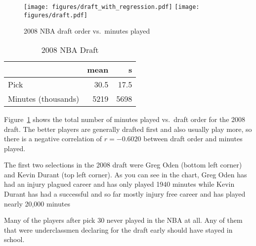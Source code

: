 \documentclass[letterpaper]{exam}
\begin{document}
\begin{questions}
      \question{}\label{q:draft}

        \begin{figure}[H]
          \centering
          \ifprintanswers{}
            \texttt{[image: figures/draft\_with\_regression.pdf]}
          \else
            \texttt{[image: figures/draft.pdf]}
          \fi
          \caption{2008 NBA draft order vs.\ minutes played}\label{fig:draft}
        \end{figure}

        \begin{table}[H]
          \centering
          \begin{tabular}{lrr}
            \toprule
                                & mean & s \\
            \midrule
            Pick                & 30.5 & 17.5 \\
            Minutes (thousands) & 5219 & 5698 \\
            \bottomrule
          \end{tabular}
          \caption{2008 NBA Draft}
        \end{table}

        Figure~\ref{fig:draft} shows the total number of minutes played vs.\ draft
        order for the 2008 draft.  The better players are generally drafted first
        and also usually play more, so there is a negative correlation of 
        $r = -0.6020$ between draft order and minutes played.

        The first two selections in the 2008 draft were Greg Oden (bottom left
        corner) and Kevin Durant (top left corner).  As you can see in the
        chart, Greg Oden has had an injury plagued career and has only played
        1940 minutes while Kevin Durant has had a successful and so far mostly
        injury free career and has played nearly 20,000 minutes

        Many of the players after pick 30 never played in the NBA at all.  Any
        of them that were underclassmen declaring for the draft early should
        have stayed in school.

\end{questions}
\end{document}
